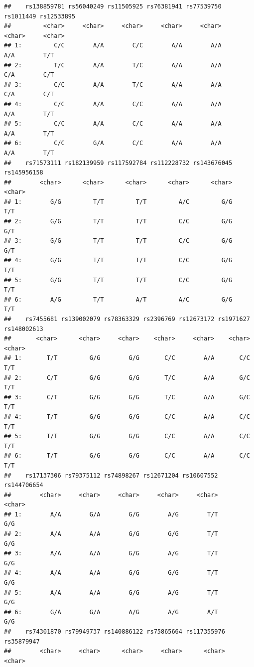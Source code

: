 \documentclass[
]{article}
\begin{document}
\begin{verbatim}
##    rs138859781 rs56040249 rs11505925 rs76381941 rs77539750 rs1011449 rs12533895
##         <char>     <char>     <char>     <char>     <char>    <char>     <char>
## 1:         C/C        A/A        C/C        A/A        A/A       A/A        T/T
## 2:         T/C        A/A        T/C        A/A        A/A       C/A        C/T
## 3:         C/C        A/A        T/C        A/A        A/A       C/A        C/T
## 4:         C/C        A/A        C/C        A/A        A/A       A/A        T/T
## 5:         C/C        A/A        C/C        A/A        A/A       A/A        T/T
## 6:         C/C        G/A        C/C        A/A        A/A       A/A        T/T
##    rs71573111 rs182139959 rs117592784 rs112228732 rs143676045 rs145956158
##        <char>      <char>      <char>      <char>      <char>      <char>
## 1:        G/G         T/T         T/T         A/C         G/G         T/T
## 2:        G/G         T/T         T/T         C/C         G/G         G/T
## 3:        G/G         T/T         T/T         C/C         G/G         G/T
## 4:        G/G         T/T         T/T         C/C         G/G         T/T
## 5:        G/G         T/T         T/T         C/C         G/G         T/T
## 6:        A/G         T/T         A/T         A/C         G/G         T/T
##    rs7455681 rs139002079 rs78363329 rs2396769 rs12673172 rs1971627 rs148002613
##       <char>      <char>     <char>    <char>     <char>    <char>      <char>
## 1:       T/T         G/G        G/G       C/C        A/A       C/C         T/T
## 2:       C/T         G/G        G/G       T/C        A/A       G/C         T/T
## 3:       C/T         G/G        G/G       T/C        A/A       G/C         T/T
## 4:       T/T         G/G        G/G       C/C        A/A       C/C         T/T
## 5:       T/T         G/G        G/G       C/C        A/A       C/C         T/T
## 6:       T/T         G/G        G/G       C/C        A/A       C/C         T/T
##    rs17137306 rs79375112 rs74898267 rs12671204 rs10607552 rs144706654
##        <char>     <char>     <char>     <char>     <char>      <char>
## 1:        A/A        G/A        G/G        A/G        T/T         G/G
## 2:        A/A        A/A        G/G        G/G        T/T         G/G
## 3:        A/A        A/A        G/G        A/G        T/T         G/G
## 4:        A/A        A/A        G/G        G/G        T/T         G/G
## 5:        A/A        A/A        G/G        A/G        T/T         G/G
## 6:        G/A        G/A        A/G        A/G        A/T         G/G
##    rs74301870 rs79949737 rs140886122 rs75865664 rs117355976 rs35879947
##        <char>     <char>      <char>     <char>      <char>     <char>

\end{verbatim}
\end{document}
